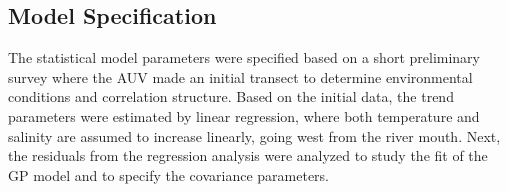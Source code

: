 \documentclass[aoas]{imsart}
\begin{document}
\subsection{Model Specification}

The statistical model parameters were specified based on a short
preliminary survey where the AUV made an initial transect to determine
environmental conditions and correlation structure. Based on the
initial data, the trend parameters were estimated by linear
regression, where both temperature and salinity are assumed to
increase linearly, going west from the river mouth. Next, the
residuals from the regression analysis were analyzed to study the fit
of the GP model and to specify the covariance parameters.

\end{document}
